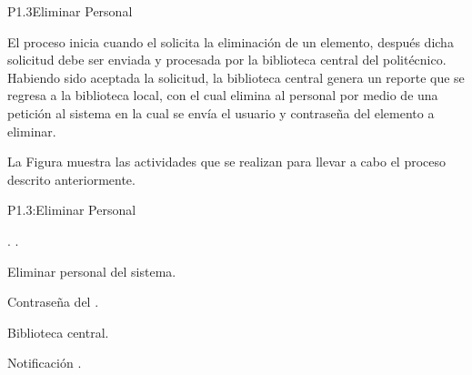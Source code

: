 




\begin{Proceso}{P1.3}{Eliminar Personal} {
  
El proceso inicia cuando el  solicita la eliminación de un elemento, después dicha solicitud debe ser enviada y procesada por la biblioteca central del politécnico. Habiendo sido aceptada la solicitud, la biblioteca central genera un reporte que se regresa a la biblioteca local, con el cual elimina al personal por medio de una petición al sistema en la cual se envía el usuario y contraseña del elemento a eliminar.
  



  \noindent La Figura  muestra las actividades que se realizan para llevar a cabo el proceso descrito anteriormente.


} {P1.3:Eliminar Personal}


   { %
    .
    .
  }

   { %
    Eliminar personal del sistema.
  }

   { %
  	\begin{UClist}
  		\UCli Contraseña del .
    \end {UClist}
  }
  
   { %
    Biblioteca central.
  }

   { %
    \begin{UClist}
      \UCli   Notificación .
    \end{UClist}
  }


\end{Proceso}
